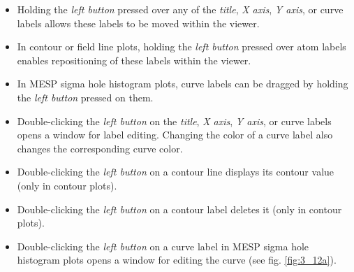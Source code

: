 \documentclass[10pt]{article}
\begin{document}
\begin{itemize}
\item Holding the {\it left button} pressed over any of the {\it title},  
{\it X axis}, {\it Y axis}, or curve labels allows these labels  
to be moved within the viewer.  

\item In contour or field line plots, holding the {\it left button} pressed over  
atom labels enables repositioning of these labels within the viewer.  

\item In MESP sigma hole histogram plots, curve labels can be dragged  
by holding the {\it left button} pressed on them.  

\item Double-clicking the {\it left button} on the {\it title}, {\it X axis},  
{\it Y axis}, or curve labels opens a window for label editing.  
Changing the color of a curve label also changes the corresponding curve color.  

\item Double-clicking the {\it left button} on a contour line  
displays its contour value (only in contour plots).  

\item Double-clicking the {\it left button} on a contour label deletes it  
(only in contour plots).  

\item Double-clicking the {\it left button} on a curve label in  
MESP sigma hole histogram plots opens a window for editing the curve  
(see fig. \ref{fig:3_12a}).  


\end{itemize}
\end{document}
